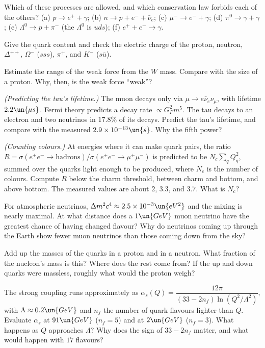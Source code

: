 \begin{problems}
\core Which of these processes are allowed, and which conservation law forbids each of the others? (a) $p\to e^+ + \gamma$; (b) $n\to p + e^- + \bar\nu_e$; (c) $\mu^-\to e^- + \gamma$; (d) $\pi^0\to\gamma + \gamma$; (e) $\Lambda^0\to p + \pi^-$ (the $\Lambda^0$ is $uds$); (f) $e^+ + e^-\to\gamma$.

\core Give the quark content and check the electric charge of the proton, neutron, $\Delta^{++}$, $\Omega^-$ ($sss$), $\pi^+$, and $K^-$ ($s\bar u$).

 Estimate the range of the weak force from the $W$ mass. Compare with the size of a proton. Why, then, is the weak force ``weak''?

\core \emph{(Predicting the tau's lifetime.)} The muon decays only via $\mu\to e\bar\nu_e\nu_\mu$, with lifetime $2.2\un{\mu s}$. Fermi theory predicts a decay rate $\propto G_F^2m^5$. The tau decays to an electron and two neutrinos in $17.8\%$ of its decays. Predict the tau's lifetime, and compare with the measured $2.9\times10^{-13}\un{s}$. Why the fifth power?

\core \emph{(Counting colours.)} At energies where it can make quark pairs, the ratio $R = \sigma(e^+e^-\to\text{hadrons})/\sigma(e^+e^-\to\mu^+\mu^-)$ is predicted to be $N_c\sum_qQ_q^2$, summed over the quarks light enough to be produced, where $N_c$ is the number of colours. Compute $R$ below the charm threshold, between charm and bottom, and above bottom. The measured values are about $2$, $3.3$, and $3.7$. What is $N_c$?

 For atmospheric neutrinos, $\Delta m^2c^4\approx2.5\times10^{-3}\un{eV^2}$ and the mixing is nearly maximal. At what distance does a $1\un{GeV}$ muon neutrino have the greatest chance of having changed flavour? Why do neutrinos coming up through the Earth show fewer muon neutrinos than those coming down from the sky?

\core \label{prob:proton-mass} Add up the masses of the quarks in a proton and in a neutron. What fraction of the nucleon's mass is this? Where does the rest come from? If the up and down quarks were massless, roughly what would the proton weigh?

 \label{prob:alphas} The strong coupling runs approximately as $\alpha_s(Q) = \dfrac{12\pi}{(33-2n_f)\ln(Q^2/\Lambda^2)}$, with $\Lambda\approx0.2\un{GeV}$ and $n_f$ the number of quark flavours lighter than $Q$. Evaluate $\alpha_s$ at $91\un{GeV}$ ($n_f = 5$) and at $2\un{GeV}$ ($n_f = 3$). What happens as $Q$ approaches $\Lambda$? Why does the sign of $33 - 2n_f$ matter, and what would happen with $17$ flavours?


\end{problems}
